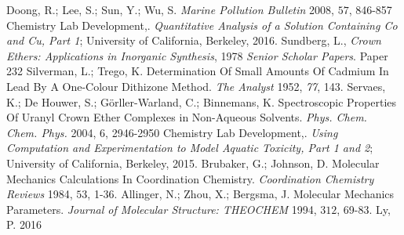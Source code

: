 \documentclass[letterpaper,12pt]{article}
\begin{document}
	\newpage
	\begin{thebibliography}{99}
		 Doong, R.; Lee, S.; Sun, Y.; Wu, S. \emph{Marine Pollution Bulletin} 2008, $57$, 846-857
		 Chemistry Lab Development,. \emph{Quantitative Analysis of a Solution Containing Co and Cu, Part 1}; University of California, Berkeley, 2016.
		 Sundberg, L., \emph{Crown Ethers: Applications in Inorganic Synthesis}, 1978 \emph{Senior Scholar Papers}. Paper 232
		 Silverman, L.; Trego, K. Determination Of Small Amounts Of Cadmium In Lead By A One-Colour Dithizone Method. \emph{The Analyst} 1952, \emph{77}, 143.
		 Servaes, K.; De Houwer, S.; G\"orller-Warland, C.; Binnemans, K. Spectroscopic Properties Of Uranyl Crown Ether Complexes in Non-Aqueous Solvents. \emph{Phys. Chem. Chem. Phys.} 2004, $6$, 2946-2950
		  Chemistry Lab Development,. \emph{Using Computation and Experimentation to Model Aquatic Toxicity, Part 1 and 2}; University of California, Berkeley, 2015.
		 Brubaker, G.; Johnson, D. Molecular Mechanics Calculations In Coordination Chemistry. \emph{Coordination Chemistry Reviews} 1984, $53$, 1-36.
		 Allinger, N.; Zhou, X.; Bergsma, J. Molecular Mechanics Parameters. \emph{Journal of Molecular Structure: THEOCHEM } 1994, $312$, 69-83.	
		 Ly, P. 2016
		\end{thebibliography}
\end{document}
